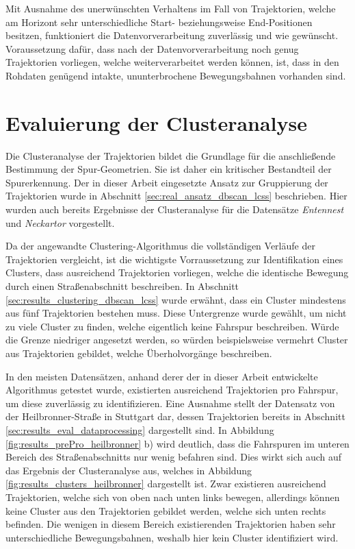 Mit Ausnahme des unerwünschten Verhaltens im Fall von Trajektorien, welche am Horizont sehr unterschiedliche Start-
beziehungsweise End-Positionen besitzen, funktioniert die Datenvorverarbeitung zuverlässig und wie gewünscht.
Voraussetzung dafür, dass nach der Datenvorverarbeitung noch genug Trajektorien vorliegen, welche weiterverarbeitet werden können,
ist, dass in den Rohdaten genügend intakte, ununterbrochene Bewegungsbahnen vorhanden sind.

\section{Evaluierung der Clusteranalyse}
\label{sec:results_eval_clustering}

Die Clusteranalyse der Trajektorien bildet die Grundlage für die anschließende Bestimmung der Spur-Geometrien.
Sie ist daher ein kritischer Bestandteil der Spurerkennung. Der in dieser Arbeit eingesetzte Ansatz zur
Gruppierung der Trajektorien wurde in Abschnitt \ref{sec:real_ansatz_dbscan_lcss} beschrieben.
Hier wurden auch bereits Ergebnisse der Clusteranalyse für die Datensätze \textit{Entennest} und
\textit{Neckartor} vorgestellt.

Da der angewandte Clustering-Algorithmus die vollständigen Verläufe der
Trajektorien vergleicht, ist die wichtigste Vorraussetzung zur Identifikation eines Clusters, dass ausreichend
Trajektorien vorliegen, welche die identische Bewegung durch einen Straßenabschnitt beschreiben.
In Abschnitt \ref{sec:results_clustering_dbscan_lcss} wurde erwähnt, dass ein Cluster mindestens aus
fünf Trajektorien bestehen muss. Diese Untergrenze wurde gewählt, um nicht zu viele Cluster zu finden, welche
eigentlich keine Fahrspur beschreiben. Würde die Grenze niedriger angesetzt werden, so würden beispielsweise
vermehrt Cluster aus Trajektorien gebildet, welche Überholvorgänge beschreiben.

In den meisten Datensätzen, anhand derer der in dieser Arbeit entwickelte Algorithmus getestet wurde,
existierten ausreichend Trajektorien pro Fahrspur, um diese zuverlässig zu identifizieren. Eine Ausnahme
stellt der Datensatz von der Heilbronner-Straße in Stuttgart dar, dessen Trajektorien bereits
in Abschnitt \ref{sec:results_eval_dataprocessing} dargestellt sind. In Abbildung \ref{fig:results_prePro_heilbronner} b)
wird deutlich, dass die Fahrspuren im unteren Bereich des Straßenabschnitts nur wenig befahren sind.
Dies wirkt sich auch auf das Ergebnis der Clusteranalyse aus, welches in Abbildung \ref{fig:results_clusters_heilbronner} dargestellt ist.
Zwar existieren ausreichend Trajektorien, welche sich von oben nach unten links bewegen, allerdings können
keine Cluster aus den Trajektorien gebildet werden, welche sich unten rechts befinden.
Die wenigen in diesem Bereich existierenden Trajektorien haben sehr unterschiedliche Bewegungsbahnen,
weshalb hier kein Cluster identifiziert wird.

